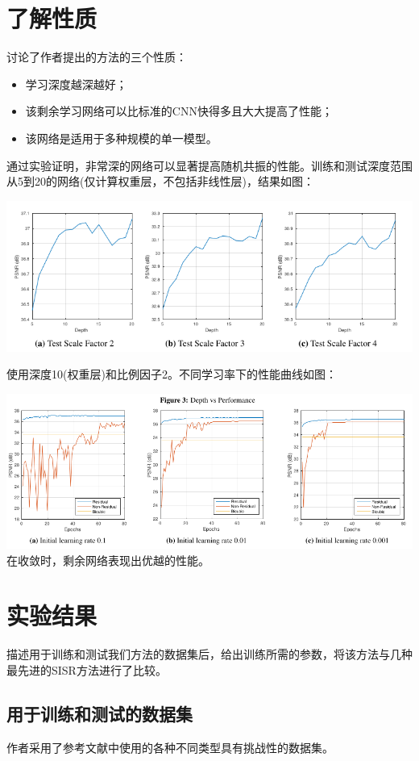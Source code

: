 \documentclass[UTF8,a4paper,10pt]{ctexrep}
\begin{document}
\section{了解性质}
讨论了作者提出的方法的三个性质：

\begin{itemize}
  \item 学习深度越深越好；
  \item 该剩余学习网络可以比标准的CNN快得多且大大提高了性能；
  \item 该网络是适用于多种规模的单一模型。
\end{itemize}

通过实验证明，非常深的网络可以显著提高随机共振的性能。训练和测试深度范围从5到20的网络(仅计算权重层，不包括非线性层)，结果如图：

\includegraphics[width=\textwidth]{figure/depth.png}

使用深度10(权重层)和比例因子2。不同学习率下的性能曲线如图：

\includegraphics[width=\textwidth]{figure/rate.png}
在收敛时，剩余网络表现出优越的性能。

\section{实验结果}
描述用于训练和测试我们方法的数据集后，给出训练所需的参数，将该方法与几种最先进的SISR方法进行了比较。

\subsection{用于训练和测试的数据集}
作者采用了参考文献中使用的各种不同类型具有挑战性的数据集。
\end{document}
